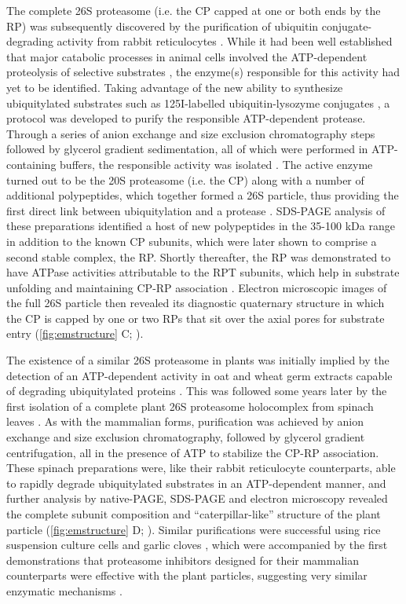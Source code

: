 The complete 26S proteasome (i.e. the CP capped at one or both ends by the RP) was subsequently discovered by the purification of ubiquitin conjugate-degrading activity from rabbit reticulocytes \citep{hough86}.  While it had been well established that major catabolic processes in animal cells involved the ATP-dependent proteolysis of selective substrates \citep{etlinger77}, the enzyme(s) responsible for this activity had yet to be identified.  Taking advantage of the new ability to synthesize ubiquitylated substrates such as 125I-labelled ubiquitin-lysozyme conjugates \citep{hough86-1xVPf}, a protocol was developed to purify the responsible ATP-dependent protease.  Through a series of anion exchange and size exclusion chromatography steps followed by glycerol gradient sedimentation, all of which were performed in ATP-containing buffers, the responsible activity was isolated \citep{hough86, hough87}. The active enzyme turned out to be the 20S proteasome (i.e. the CP) along with a number of additional polypeptides, which together formed a 26S particle, thus providing the first direct link between ubiquitylation and a protease \citep{ganoth88, hough87, waxman87}.  SDS-PAGE analysis of these preparations identified a host of new polypeptides in the 35-100 kDa range in addition to the known CP subunits, which were later shown to comprise a second stable complex, the RP.  Shortly thereafter, the RP was demonstrated to have ATPase activities attributable to the RPT subunits, which help in substrate unfolding and maintaining CP-RP association \citep{armon90}.  Electron microscopic images of the full 26S particle then revealed its diagnostic quaternary structure in which the CP is capped by one or two RPs that sit over the axial pores for substrate entry (\ref{fig:emstructure} C; \citep{peters91, yoshimura93}).

The existence of a similar 26S proteasome in plants was initially implied by the detection of an ATP-dependent activity in oat and wheat germ extracts capable of degrading ubiquitylated proteins \citep{hatfield89, vierstra88}.  This was followed some years later by the first isolation of a complete plant 26S proteasome holocomplex from spinach leaves \citep{fujinami94}.  As with the mammalian forms, purification was achieved by anion exchange and size exclusion chromatography, followed by glycerol gradient centrifugation, all in the presence of ATP to stabilize the CP-RP association.  These spinach preparations were, like their rabbit reticulocyte counterparts, able to rapidly degrade ubiquitylated substrates in an ATP-dependent manner, and further analysis by native-PAGE, SDS-PAGE and electron microscopy revealed the complete subunit composition and “caterpillar-like” structure of the plant particle (\ref{fig:emstructure} D; \citep{fujinami94}).  Similar purifications were successful using rice suspension culture cells and garlic cloves \citep{malik04, yanagawa99}, which were accompanied by the first demonstrations that proteasome inhibitors designed for their mammalian counterparts were effective with the plant particles, suggesting very similar enzymatic mechanisms \citep{ozaki92, woffenden98}.  

